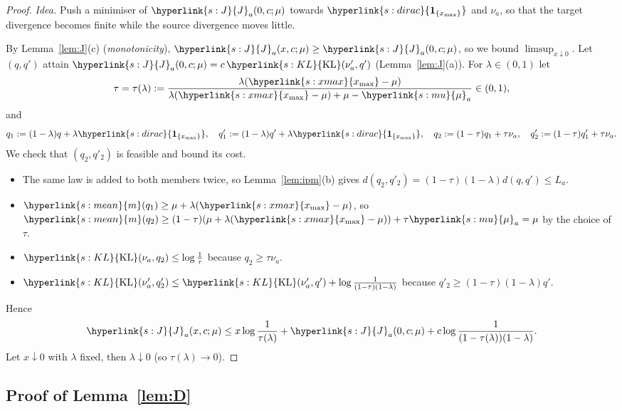 \documentclass[11pt]{article}
\newcommand{\sy}[2]{{\hyperlink{#1}{#2}}}
\newcommand{\xmax}{\sy{s:xmax}{x_{\max}}}
\newcommand{\mean}{\sy{s:mean}{m}}
\newcommand{\KL}{\sy{s:KL}{\mathrm{KL}}}
\newcommand{\dirac}{\sy{s:dirac}{\mathbf{1}_{\{x_{\max}\}}}}
\newcommand{\mk}{\sy{s:mu}{\mu}}
\newcommand{\Jf}{\sy{s:J}{J}}
\begin{document}
\begin{proof}
\emph{Idea.} Push a minimiser of $\Jf_a(0,c;\mu)$ towards $\dirac$ and $\nu_a$, so that the target
divergence becomes finite while the source divergence moves little.

By Lemma~\ref{lem:J}(c) (\emph{monotonicity}), $\Jf_a(x,c;\mu)\ge \Jf_a(0,c;\mu)$, so we bound
$\limsup_{x\downarrow0}$. Let $(q,q')$ attain $\Jf_a(0,c;\mu)=c\,\KL(\nu'_a,q')$ (Lemma~\ref{lem:J}(a)).
For $\lambda\in(0,1)$ let
\begin{equation*}
\tau=\tau(\lambda):=\frac{\lambda(\xmax-\mu)}{\lambda(\xmax-\mu)+\mu-\mk_a}\in(0,1),
\end{equation*}
and
\begin{equation*}
q_1:=(1-\lambda)q+\lambda\dirac,\quad q'_1:=(1-\lambda)q'+\lambda\dirac,\quad
q_2:=(1-\tau)q_1+\tau\nu_a,\quad q'_2:=(1-\tau)q'_1+\tau\nu_a .
\end{equation*}
We check that $(q_2,q'_2)$ is feasible and bound its cost.
\begin{itemize}
\item The same law is added to both members twice, so Lemma~\ref{lem:ipm}(b) gives
  $d(q_2,q'_2)=(1-\tau)(1-\lambda)d(q,q')\le L_a$.
\item $\mean(q_1)\ge\mu+\lambda(\xmax-\mu)$, so $\mean(q_2)\ge(1-\tau)(\mu+\lambda(\xmax-\mu))+\tau\mk_a=\mu$
  by the choice of $\tau$.
\item $\KL(\nu_a,q_2)\le\log\frac1\tau$ because $q_2\ge\tau\nu_a$.
\item $\KL(\nu'_a,q'_2)\le\KL(\nu'_a,q')+\log\frac{1}{(1-\tau)(1-\lambda)}$ because
  $q'_2\ge(1-\tau)(1-\lambda)q'$.
\end{itemize}
Hence
\begin{equation*}
\Jf_a(x,c;\mu)\le x\log\frac{1}{\tau(\lambda)}+\Jf_a(0,c;\mu)+c\log\frac{1}{(1-\tau(\lambda))(1-\lambda)}.
\end{equation*}
Let $x\downarrow0$ with $\lambda$ fixed, then $\lambda\downarrow0$ (so $\tau(\lambda)\to0$).
\end{proof}

\subsection{Proof of Lemma~\ref{lem:D}}\label{sec:proof-lem-D}
\end{document}
